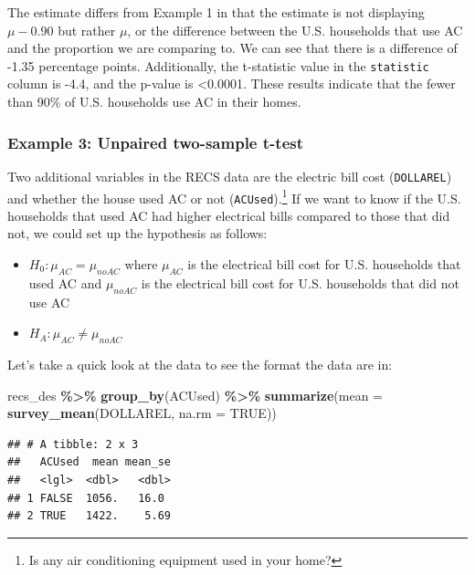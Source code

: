 \documentclass[
]{krantz}
\makeatletter
\newenvironment{Shaded}{\begin{snugshade}}{\end{snugshade}}
\newcommand{\AttributeTok}[1]{\textcolor[rgb]{0.27,0.27,0.27}{#1}}
\newcommand{\ConstantTok}[1]{\textcolor[rgb]{0.37,0.37,0.37}{#1}}
\newcommand{\FunctionTok}[1]{\textcolor[rgb]{0.27,0.27,0.27}{\textbf{#1}}}
\newcommand{\NormalTok}[1]{#1}
\newcommand{\SpecialCharTok}[1]{\textcolor[rgb]{0.43,0.43,0.43}{\textbf{#1}}}
\providecommand{\tightlist}{%
  \setlength{\itemsep}{0pt}\setlength{\parskip}{0pt}}
\newenvironment{kframe}{%
\medskip{}
\setlength{\fboxsep}{.8em}
 \def\at@end@of@kframe{}%
 \ifinner\ifhmode%
  \def\at@end@of@kframe{\end{minipage}}%
  \begin{minipage}{\columnwidth}%
 \fi\fi%
 \def\FrameCommand##1{\hskip\@totalleftmargin \hskip-\fboxsep
 \colorbox{shadecolor}{##1}\hskip-\fboxsep
     \hskip-\linewidth \hskip-\@totalleftmargin \hskip\columnwidth}%
 \MakeFramed {\advance\hsize-\width
   \@totalleftmargin\z@ \linewidth\hsize
   \@setminipage}}%
 {\par\unskip\endMakeFramed%
 \at@end@of@kframe}
\renewenvironment{Shaded}{\begin{kframe}}{\end{kframe}}
\makeatother
\begin{document}
The estimate differs from Example 1 in that the estimate is not displaying \(\mu - 0.90\) but rather \(\mu\), or the difference between the U.S. households that use AC and the proportion we are comparing to. We can see that there is a difference of -1.35 percentage points. Additionally, the t-statistic value in the \texttt{statistic} column is -4.4, and the p-value is \textless0.0001. These results indicate that the fewer than 90\% of U.S. households use AC in their homes.

\hypertarget{stattest-ttest-ex3}{%
\subsubsection*{Example 3: Unpaired two-sample t-test}\label{stattest-ttest-ex3}}


Two additional variables in the RECS data are the electric bill cost (\texttt{DOLLAREL}) and whether the house used AC or not (\texttt{ACUsed}).\footnote{Is any air conditioning equipment used in your home?} If we want to know if the U.S. households that used AC had higher electrical bills compared to those that did not, we could set up the hypothesis as follows:

\begin{itemize}
\tightlist
\item
  \(H_0: \mu_{AC} = \mu_{noAC}\) where \(\mu_{AC}\) is the electrical bill cost for U.S. households that used AC and \(\mu_{noAC}\) is the electrical bill cost for U.S. households that did not use AC
\item
  \(H_A: \mu_{AC} \neq \mu_{noAC}\)
\end{itemize}

Let's take a quick look at the data to see the format the data are in:

\begin{Shaded}
\begin{Highlighting}[]
\NormalTok{recs\_des }\SpecialCharTok{\%\textgreater{}\%}
  \FunctionTok{group\_by}\NormalTok{(ACUsed) }\SpecialCharTok{\%\textgreater{}\%}
  \FunctionTok{summarize}\NormalTok{(}\AttributeTok{mean =} \FunctionTok{survey\_mean}\NormalTok{(DOLLAREL, }\AttributeTok{na.rm =} \ConstantTok{TRUE}\NormalTok{))}
\end{Highlighting}
\end{Shaded}

\begin{verbatim}
## # A tibble: 2 x 3
##   ACUsed  mean mean_se
##   <lgl>  <dbl>   <dbl>
## 1 FALSE  1056.   16.0 
## 2 TRUE   1422.    5.69
\end{verbatim}
\end{document}
